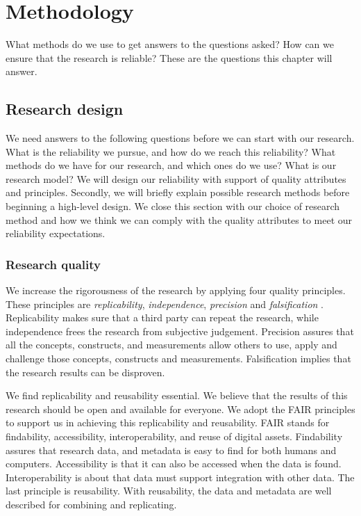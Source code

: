 \chapter{Methodology}
\setcounter{footnote}{0}
\label{ch:methodology}
What methods do we use to get answers to the questions asked? How can we ensure that the research is reliable? These are the questions this chapter will answer.

\section{Research design}
\label{sec:researchquality}
We need answers to the following questions before we can start with our research. What is the reliability we pursue, and how do we reach this reliability? What methods do we have for our research, and which ones do we use? What is our research model? We will design our reliability with support of quality attributes and principles. Secondly, we will briefly explain possible research methods before beginning a high-level design. We close this section with our choice of research method and how we think we can comply with the quality attributes to meet our reliability expectations.

\subsection{Research quality}
\label{sub:researchquality}
We increase the rigorousness of the research by applying four quality principles. These principles are \textit{replicability}, \textit{independence}, \textit{precision} and \textit{falsification} \parencite[p.~16--18]{Recker2012}. Replicability makes sure that a third party can repeat the research, while independence frees the research from subjective judgement. Precision assures that all the concepts, constructs, and measurements allow others to use, apply and challenge those concepts, constructs and measurements. Falsification implies that the research results can be disproven.

We find replicability and reusability essential. We believe that the results of this research should be open and available for everyone. We adopt the FAIR principles \parencite{Wilkinson2016} to support us in achieving this replicability and reusability. FAIR stands for findability, accessibility, interoperability, and reuse of digital assets. Findability assures that research data, and metadata is easy to find for both humans and computers. Accessibility is that it can also be accessed when the data is found. Interoperability is about that data must support integration with other data. The last principle is reusability. With reusability, the data and metadata are well described for combining and replicating.

